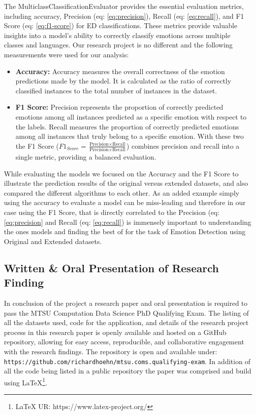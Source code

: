 \documentclass[11pt]{article}
\begin{document}
The MulticlassClassificationEvaluator provides the essential evaluation metrics, including accuracy, Precision (eq: \ref{eq:precision}), Recall (eq: \ref{eq:recall}), and F1 Score (eq: \ref{eq:f1-score}) for ED classifications. These metrics provide valuable insights into a model's ability to correctly classify emotions across multiple classes and languages. Our research project is no different and the following measurements were used for our analysis:
\begin{itemize}

\item \textbf{Accuracy:} Accuracy measures the overall correctness of the emotion predictions made by the model. It is calculated as the ratio of correctly classified instances to the total number of instances in the dataset.

\item \textbf{F1 Score:} Precision represents the proportion of correctly predicted emotions among all instances predicted as a specific emotion with respect to the labels. Recall measures the proportion of correctly predicted emotions among all instances that truly belong to a specific emotion. With these two the F1 Score ($F1_{Score}=\frac{\text{Precision} \times \text{Recall}}{\text{Precision} + \text{Recall}}$) combines precision and recall into a single metric, providing a balanced evaluation.

\end{itemize}

While evaluating the models we focused on the Accuracy and the F1 Score to illustrate the prediction results of the original versus extended datasets, and also compared the different algorithms to each other. As an added example simply using the accuracy to evaluate a model can be miss-leading and therefore in our case using the F1 Score, that is directly correlated to the Precision (eq: \ref{eq:precision} and Recall (eq: \ref{eq:recall}) is immensely important to understanding the ones models and finding the best of for the task of Emotion Detection using Original and Extended datasets.

\subsection{Written \& Oral Presentation of Research Finding}
In conclusion of the project a research paper and oral presentation is required to pass the  MTSU Computation Data Science PhD Qualifying Exam. The listing of all the datasets used, code for the application, and details of the research project process in this research paper is openly available and hosted on a GitHub repository, allowing for easy access, reproducible, and collaborative engagement with the research findings. The repository is open and available under: \texttt{https://github.com/richardhoehn/mtsu.coms.qualifying-exam}\cite{Hoehn_Improving_Emotion_Detection_2023}. In addition of all the code being listed in a public repository the paper was comprised and build using \LaTeX\footnote{LaTeX UR: https://www.latex-project.org/}.
\end{document}
